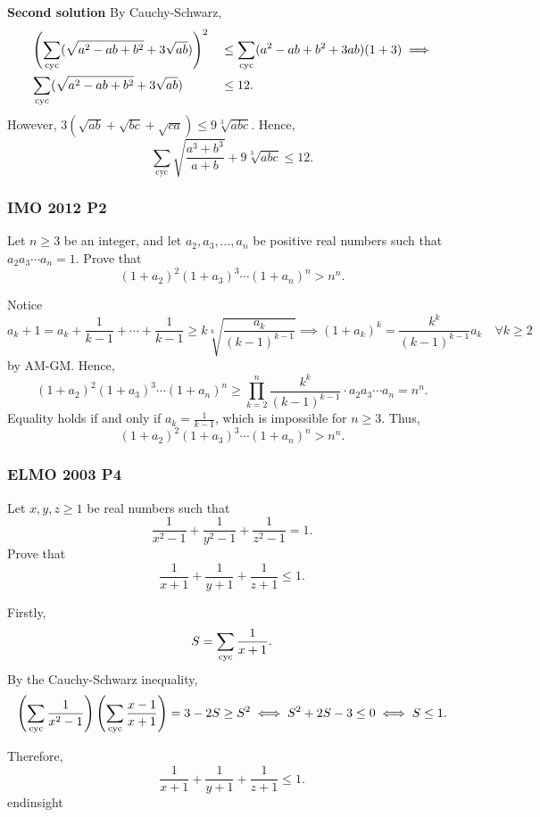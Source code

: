 \documentclass[12pt]{article}
\begin{document}
\textbf{\textcolor{color1}{Second solution}} By Cauchy-Schwarz,
\begin{align*}
	 & \left(\sum_{\text{cyc}}(\sqrt{a^2-ab+b^2} + 3\sqrt{ab})\right)^2 &  & \le \sum_{\text{cyc}}(a^2-ab+b^2 + 3ab)(1+3) \implies \\
	 & \sum_{\text{cyc}}(\sqrt{a^2-ab+b^2} + 3\sqrt{ab})                &  & \le 12.
\end{align*}
However, $3(\sqrt{ab}+\sqrt{bc}+\sqrt{ca}) \le 9\sqrt[3]{abc}$. Hence,
\[\sum_{\text{cyc}}\sqrt{\frac{a^3+b^3}{a+b}}+9\sqrt[3]{abc}\le12.\]

\clearpage

\subsubsection{IMO 2012 P2}

\begin{problem}
Let $n\ge 3$ be an integer, and let $a_2,a_3,\ldots ,a_n$ be positive real numbers such that $a_{2}a_{3}\cdots a_{n}=1$. Prove that
\[(1 + a_2)^2 (1 + a_3)^3 \dotsm (1 + a_n)^n > n^n.\]
\end{problem}

Notice
\[
	a_k+1=a_k+\frac{1}{k-1}+\cdots+\frac{1}{k-1} \ge k\sqrt[k]{\frac{a_k}{(k-1)^{k-1}}} \implies (1+a_k)^k = \frac{k^k}{(k-1)^{k-1}}a_k \quad \forall k \ge 2
\]
by AM-GM. Hence,
\[
	(1 + a_2)^2 (1 + a_3)^3 \dotsm (1 + a_n)^n \ge \prod_{k=2}^{n} \frac{k^k}{(k-1)^{k-1}} \cdot a_2a_3\cdots a_n =
	n^n.
\]
Equality holds if and only if $a_k=\frac{1}{k-1}$, which is impossible for $n \ge 3$.
Thus,
\[
	(1 + a_2)^2 (1 + a_3)^3 \dotsm (1 + a_n)^n > n^n.
\]

\clearpage

\subsubsection{ELMO 2003 P4}

\begin{problem}
Let $x,y,z \ge 1$ be real numbers such that\[ \frac{1}{x^2-1} + \frac{1}{y^2-1} + \frac{1}{z^2-1} = 1. \]Prove that\[ \frac{1}{x+1} + \frac{1}{y+1} + \frac{1}{z+1} \le 1. \]
\end{problem}

Firstly,
\[
	S=\sum_{\text{cyc}} \frac{1}{x+1}.
\]
By the Cauchy-Schwarz inequality,
\[
	\left(\sum_{\text{cyc}} \frac{1}{x^2-1}\right)\left(\sum_{\text{cyc}} \frac{x-1}{x+1}\right) = 3 - 2S \ge S^2 \iff S^2+2S-3 \le 0 \iff S \le 1.
\]

Therefore,
\[ \frac{1}{x+1} + \frac{1}{y+1} + \frac{1}{z+1} \le 1. \]
end{insight}
\end{document}

